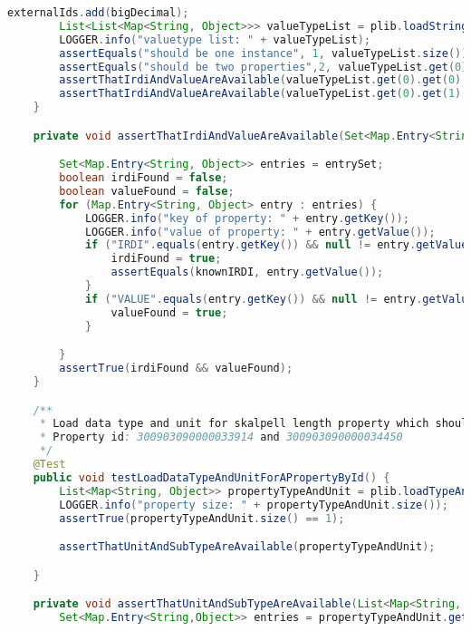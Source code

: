 \begin{lstlisting}[caption=Beispiel eines Integrationstests, language=Java, label=lst:integrationstest_beispiel]
        externalIds.add(bigDecimal);
        List<List<Map<String, Object>>> valueTypeList = plib.loadStringPropertiesByExternalIds(externalIds);
        LOGGER.info("valuetype list: " + valueTypeList);
        assertEquals("should be one instance", 1, valueTypeList.size());
        assertEquals("should be two properties",2, valueTypeList.get(0).size());
        assertThatIrdiAndValueAreAvailable(valueTypeList.get(0).get(0).entrySet(), "0173-1#02-AAA762#1");
        assertThatIrdiAndValueAreAvailable(valueTypeList.get(0).get(1).entrySet(), "0173-1#02-AAB011#1");
    }

    private void assertThatIrdiAndValueAreAvailable(Set<Map.Entry<String, Object>> entrySet, String knownIRDI) {

        Set<Map.Entry<String, Object>> entries = entrySet;
        boolean irdiFound = false;
        boolean valueFound = false;
        for (Map.Entry<String, Object> entry : entries) {
            LOGGER.info("key of property: " + entry.getKey());
            LOGGER.info("value of property: " + entry.getValue());
            if ("IRDI".equals(entry.getKey()) && null != entry.getValue() && !"null".equals(entry.getValue())) {
                irdiFound = true;
                assertEquals(knownIRDI, entry.getValue());
            }
            if ("VALUE".equals(entry.getKey()) && null != entry.getValue() && !"null".equals(entry.getValue())) {
                valueFound = true;
            }

        }
        assertTrue(irdiFound && valueFound);
    }

    /**
     * Load data type and unit for skalpell length property which should be mm and mm as well.
     * Property id: 300903090000033914 and 300903090000034450
     */
    @Test
    public void testLoadDataTypeAndUnitForAPropertyById() {
        List<Map<String, Object>> propertyTypeAndUnit = plib.loadTypeAndUnitOfPropertyBy("300903090000033914");
        LOGGER.info("property size: " + propertyTypeAndUnit.size());
        assertTrue(propertyTypeAndUnit.size() == 1);

        assertThatUnitAndSubTypeAreAvailable(propertyTypeAndUnit);

    }

    private void assertThatUnitAndSubTypeAreAvailable(List<Map<String, Object>> propertyTypeAndUnit) {
        Set<Map.Entry<String,Object>> entries = propertyTypeAndUnit.get(0).entrySet();


\end{lstlisting}
